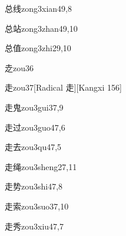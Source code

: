 \begin{verbete}{总线}{zong3xian4}{9,8}
\end{verbete}

\begin{verbete}{总站}{zong3zhan4}{9,10}
\end{verbete}

\begin{verbete}{总值}{zong3zhi2}{9,10}
\end{verbete}

\begin{verbete}{赱}{zou3}{6}
\end{verbete}

\begin{verbete}{走}{zou3}{7}[Radical 走][Kangxi 156]
\end{verbete}

\begin{verbete}{走鬼}{zou3gui3}{7,9}
\end{verbete}

\begin{verbete}{走过}{zou3guo4}{7,6}
\end{verbete}

\begin{verbete}{走去}{zou3qu4}{7,5}
\end{verbete}

\begin{verbete}{走绳}{zou3sheng2}{7,11}
\end{verbete}

\begin{verbete}{走势}{zou3shi4}{7,8}
\end{verbete}

\begin{verbete}{走索}{zou3suo3}{7,10}
\end{verbete}

\begin{verbete}{走秀}{zou3xiu4}{7,7}
\end{verbete}

